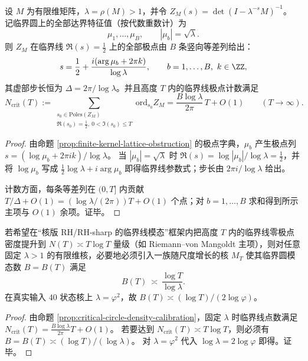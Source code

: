 \begin{proposition}\label{prop:critical-circle-density-calibration}
设 \(M\) 为有限维矩阵，\(\lambda=\rho(M)>1\)，并令
\(
Z_M(s)=\det(I-\lambda^{-s}M)^{-1}
\)。
记临界圆上的全部达界特征值（按代数重数计）为
\[
\mu_1,\dots,\mu_B,\qquad |\mu_b|=\sqrt{\lambda}.
\]
则 \(Z_M\) 在临界线 \(\Re(s)=\tfrac12\) 上的全部极点由 \(B\) 条竖向等差列给出：
\[
s=\frac12+\frac{i(\arg\mu_b+2\pi k)}{\log\lambda},\qquad b=1,\dots,B,\ k\in\ZZ,
\]
其虚部步长恒为 \(\Delta=2\pi/\log\lambda\)。并且高度 \(T\) 内的临界线极点计数满足
\[
N_{\mathrm{crit}}(T)
:=\sum_{\substack{s_0\in\mathrm{Poles}(Z_M)\\ \Re(s_0)=\tfrac12,\ 0<\Im(s_0)\le T}}\mathrm{ord}_{s_0}Z_M
=\frac{B\log\lambda}{2\pi}\,T+O(1)\qquad(T\to\infty).
\]
\end{proposition}
\begin{proof}
由命题 \ref{prop:finite-kernel-lattice-obstruction} 的极点字典，\(\mu_b\) 产生极点列
\(
s=(\log\mu_b+2\pi ik)/\log\lambda
\)。
当 \(|\mu_b|=\sqrt{\lambda}\) 时 \(\Re(s)=\log|\mu_b|/\log\lambda=\tfrac12\)，并将 \(\log\mu_b\) 写成 \(\tfrac12\log\lambda+i\arg\mu_b\) 即得临界线参数式；步长由 \(2\pi i/\log\lambda\) 给出。
\par
计数方面，每条等差列在 \((0,T]\) 内贡献 \(T/\Delta+O(1)=(\log\lambda/(2\pi))T+O(1)\) 个点；对 \(b=1,\dots,B\) 求和得到所示主项与 \(O(1)\) 余项。证毕。
\end{proof}

\begin{corollary}\label{cor:critical-circle-mode-growth}
若希望在“核版 RH/RH-sharp 的临界线模态”框架内把高度 \(T\) 内的临界线零极点密度提升到 \(N(T)\asymp T\log T\) 量级（如 Riemann--von Mangoldt 主项），则对任意固定 \(\lambda>1\) 的有限维核，必要地必须引入一族随尺度增长的核 \(M_T\) 使其临界圆模态数 \(B=B(T)\) 满足
\[
B(T)\ \asymp\ \frac{\log T}{\log\lambda}.
\]
在真实输入 \(40\) 状态核上 \(\lambda=\varphi^2\)，故 \(B(T)\asymp (\log T)/(2\log\varphi)\)。
\end{corollary}
\begin{proof}
由命题 \ref{prop:critical-circle-density-calibration}，固定 \(\lambda\) 时临界线点数满足 \(N_{\mathrm{crit}}(T)=\frac{B\log\lambda}{2\pi}T+O(1)\)。
若要达到 \(N_{\mathrm{crit}}(T)\asymp T\log T\)，则必须有 \(B=B(T)\asymp (\log T)/(\log\lambda)\)。
对 \(\lambda=\varphi^2\) 代入 \(\log\lambda=2\log\varphi\) 即得。证毕。
\end{proof}

